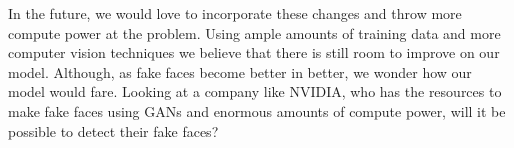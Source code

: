 \documentclass[11pt, letterpaper]{article}
\begin{document}
\begin{multicols}{2}
  In the future, we would love to incorporate these changes and throw more
  compute power at the problem. Using ample amounts of training data and more
  computer vision techniques we believe that there is still room to improve on
  our model. Although, as fake faces become better in better, we wonder how our
  model would fare. Looking at a company like NVIDIA, who has the resources to
  make fake faces using GANs and enormous amounts of compute power, will it be
  possible to detect their fake faces?

\end{multicols}



\end{document}
